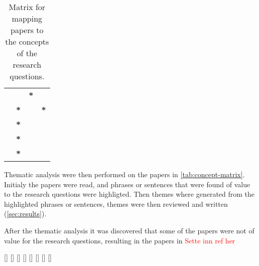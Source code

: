 \begin{table}[H]
\begin{tabular}{llll}
\cite{lmb_2011} &             & \multicolumn{1}{c}{\textbf{*}}           &            \\
\cite{hs_2011}  & \multicolumn{1}{c}{\textbf{*}}            &            & \multicolumn{1}{c}{\textbf{*}} \\
\cite{ds_2014}  & \multicolumn{1}{c}{\textbf{*}}            &            &            \\
\cite{ln_2012}  & \multicolumn{1}{c}{\textbf{*}}            &            &            \\       
\cite{pf_2017}  & \multicolumn{1}{c}{\textbf{*}}            &            &            \\ \hline       
\end{tabular}
\caption{Matrix for mapping papers to the concepts of the research questions.}
\label{tab:concept-matrix}
\end{table}
 
Thematic analysis were then performed on the papers in \autoref{tab:concept-matrix}. Initialy the papers were read, and phrases or sentences that were found of value to the research questions were highligted. Then themes where generated from the highlighted phrases or sentences, themes were then reviewed and written (\autoref{sec:results}). 

After the thematic analysis it was discovered that some of the papers were not of value for the research questions, resulting in the papers in \textcolor{red}{Sette inn ref her}

[\cite{pgd_2020}]
[\cite{sg_2008}]
[\cite{dn_2016}]
[\cite{ds_2014}]
[\cite{ln_2012}]
[\cite{pkf_2018}]
[\cite{nc_2020}]
[\cite{aj_2015}]

